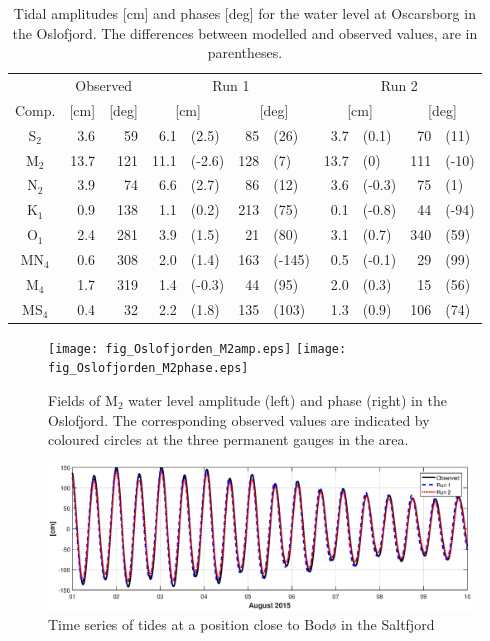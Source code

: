 \begin{table}[ht]
\caption{Tidal amplitudes [cm] and phases [deg] for the water level at Oscarsborg in the Oslofjord. The differences between modelled and observed values, are in parentheses.}
\label{tab:Oscarsborg}
\centering
\begin{tabular}{crrr@{ }lr@{ }lr@{ }lr@{ }l} \hline
      & \multicolumn{2}{c}{Observed} & \multicolumn{4}{c}{Run 1} & \multicolumn{4}{c}{Run 2}  \\
Comp. &  [cm] & [deg] & \multicolumn{2}{c}{[cm]} & \multicolumn{2}{c}{[deg]} & \multicolumn{2}{c}{[cm]} & \multicolumn{2}{c}{[deg]} \\ \hline 
S$_2$  &   3.6 &  59  &   6.1 & (2.5)  &  85 & (26)   &  3.7 & (0.1)  &  70 & (11)  \\
M$_2$  &  13.7 & 121  &  11.1 & (-2.6) & 128 & (7)    & 13.7 & (0)    & 111 & (-10) \\
N$_2$  &   3.9 &  74  &   6.6 & (2.7)  &  86 & (12)   &  3.6 & (-0.3) &  75 & (1)   \\
K$_1$  &   0.9 & 138  &   1.1 & (0.2)  & 213 & (75)   &  0.1 & (-0.8) &  44 & (-94) \\
O$_1$  &   2.4 & 281  &   3.9 & (1.5)  &  21 & (80)   &  3.1 & (0.7)  & 340 & (59)  \\
MN$_4$ &   0.6 & 308  &   2.0 & (1.4)  & 163 & (-145) &  0.5 & (-0.1) &  29 & (99)  \\
M$_4$  &   1.7 & 319  &   1.4 & (-0.3) &  44 & (95)   &  2.0 & (0.3)  &  15 & (56)  \\
MS$_4$ &   0.4 &  32  &   2.2 & (1.8)  & 135 & (103)  &  1.3 & (0.9)  & 106 & (74)  \\ \hline 
\end{tabular}
\end{table}


\begin{figure}[!t]
\centering
\texttt{[image: fig\_Oslofjorden\_M2amp.eps]}
\texttt{[image: fig\_Oslofjorden\_M2phase.eps]}
\caption{Fields of M$_2$ water level amplitude (left) and phase (right) in the Oslofjord. The corresponding observed values are indicated by coloured circles at the three permanent gauges in the area.}
\label{fig:Oslofjord_tidal_fields}
\end{figure}


\begin{figure}[!t]
\centering
\includegraphics[width=\textwidth]{fig_Saltstraumen_timeseries}
\caption{Time series of tides at a position close to Bod{\o} in the Saltfjord}
\label{fig:Saltstraumen_timeseries}
\end{figure}


